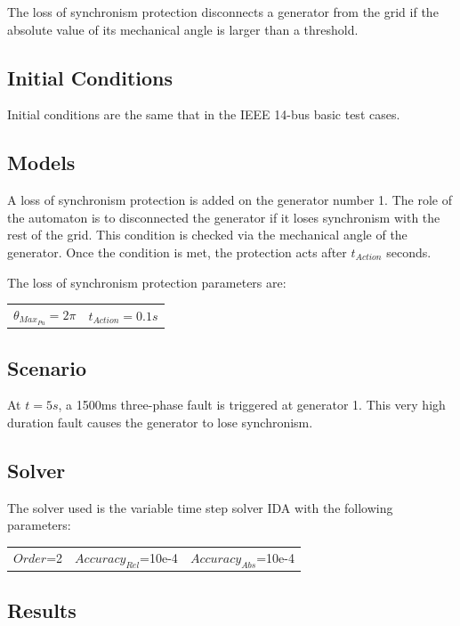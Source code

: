 \documentclass[a4paper, 12pt]{report}
\begin{document}
The loss of synchronism protection disconnects a generator from the grid if the absolute value of its mechanical angle is larger than a threshold.

\subsection{Initial Conditions}

Initial conditions are the same that in the IEEE 14-bus basic test cases.

\subsection{Models}

A loss of synchronism protection is added on the generator number 1. The role of the automaton is to disconnected the generator if it loses synchronism with the rest of the grid. This condition is checked via the mechanical angle of the generator. Once the condition is met, the protection acts after \(t_{Action}\) seconds.

The loss of synchronism protection parameters are:
\begin{center}
\begin{tabular}{l|l}
   $\theta_{Max_{Pu}}=2\pi$ & $t_{Action}=0.1s$  \\
\end{tabular}
\end{center}

\subsection{Scenario}
At $t=5s$, a 1500ms three-phase fault is triggered at generator 1. This very high duration fault causes the generator to lose synchronism.

\subsection{Solver}
The solver used is the variable time step solver IDA with the following parameters:
\begin{center}
\begin{tabular}{l|l|l}
   $Order$=2 & $Accuracy_{Rel}$=10e-4 & $Accuracy_{Abs}$=10e-4 \\
\end{tabular}
\end{center}

\newpage
\subsection{Results}
\end{document}
